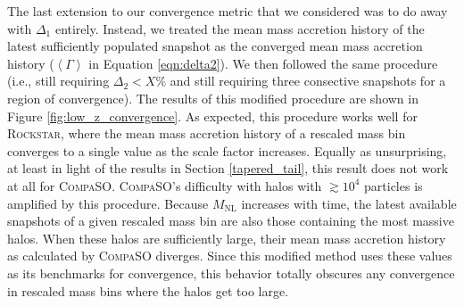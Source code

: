 The last extension to our convergence metric that we considered was to do away with $\Delta_1$ entirely. Instead, we treated the mean mass accretion history of the latest sufficiently populated snapshot as the converged mean mass accretion history ($\left<\Gamma\right>$ in Equation \ref{eqn:delta2}). We then followed the same procedure (i.e., still requiring $\Delta_2 < X\%$ and still requiring three consective snapshots for a region of convergence). The results of this modified procedure are shown in Figure \ref{fig:low_z_convergence}. As expected, this procedure works well for \textsc{Rockstar}, where the mean mass accretion history of a rescaled mass bin converges to a single value as the scale factor increases. Equally as unsurprising, at least in light of the results in Section \ref{tapered_tail}, this result does not work at all for \textsc{CompaSO}. \textsc{CompaSO}'s difficulty with halos with $\gtrsim 10^4$ particles is amplified by this procedure. Because $M_{\mathrm{NL}}$ increases with time, the latest available snapshots of a given rescaled mass bin are also those containing the most massive halos. When these halos are sufficiently large, their mean mass accretion history as calculated by \textsc{CompaSO} diverges. Since this modified method uses these values as its benchmarks for convergence, this behavior totally obscures any convergence in rescaled mass bins where the halos get too large.
